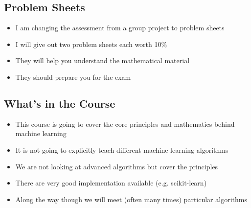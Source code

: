 
\begin{slide}
\section{Problem Sheets}

\begin{PauseHighLight}
  \begin{itemize}
  \item I am changing the assessment from a group project to problem sheets\pause
  \item I will give out two problem sheets each worth 10\%\pause
  \item They will help you understand the mathematical material\pause
  \item They should prepare you for the exam\pause
  \end{itemize}
\end{PauseHighLight}

\end{slide}


\begin{slide}
  \section[-1]{What's in the Course}

  \begin{PauseHighLight}
    \begin{itemize}
    \item This course is going to cover the core principles and
      mathematics behind machine learning\pause
    \item It is not going to explicitly teach different machine
      learning algorithms\pause
    \item We are not looking at advanced algorithms but cover the
      principles\pause
    \item There are very good implementation available (e.g.{}
      scikit-learn)\pause
    \item Along the way though we will meet (often many times)
      particular algorithms\pause
    \end{itemize}
  \end{PauseHighLight}

\end{slide}



